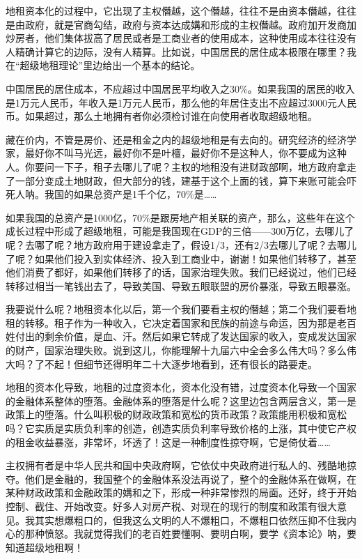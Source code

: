 \documentclass[UTF8, 12pt, a4paper]{ctexrep}
\begin{document}
地租资本化的过程中，它出现了主权僭越，这个僭越，往往不是由资本僭越，往往是由政府，就是官商勾结，政府与资本达成媾和形成的主权僭越。政府加开发商加炒房者，他们集体拔高了居民或者是工商业者的使用成本，这种使用成本往往没有人精确计算它的边际，没有人精算。比如说，中国居民的居住成本极限在哪里？我在“超级地租理论”里边给出一个基本的结论。

中国居民的居住成本，不应超过中国居民平均收入之30\%。如果我国的居民的收入是1万元人民币，年收入是1万元人民币，那么他的年居住支出不应超过3000元人民币。如果超过，那么土地拥有者你必须检讨谁在向使用者收取超级地租。

藏在价内，不管是房价、还是租金之内的超级地租是有去向的。研究经济的经济学家，最好你不叫马光远，最好你不是叶檀，最好你不是这种人，你不要成为这种人。你要问一下子，租子去哪儿了呢？主权的地租没有进财政部啊，地方政府拿走了一部分变成土地财政，但大部分的钱，建基于这个上面的钱，算下来账可能会吓死人呐。我国的如果总资产是1千个亿，70\%是……

如果我国的总资产是1000亿，70\%是跟房地产相关联的资产，那么，这些年在这个成长过程中形成了超级地租，可能是我国现在GDP的三倍——300万亿，去哪儿了呢？去哪了呢？地方政府用于建设拿走了，假设1/3，还有2/3去哪儿了呢？去哪儿了呢？如果他们投入到实体经济、投入到工商业中，谢谢！如果他们转移了，甚至他们消费了都好，如果他们转移了的话，国家治理失败。我们已经说过，他们已经转移过相当一笔钱出去了，导致美国、导致五眼联盟的房价暴涨，导致五眼暴涨。

我要说什么呢？地租资本化以后，第一个我们要看主权的僭越；第二个我们要看地租的转移。租子作为一种收入，它决定着国家和民族的前途与命运，因为那是老百姓付出的剩余价值，是血、汗。然后如果它转成了发达国家的收入，变成发达国家的财产，国家治理失败。说到这儿，你能理解十九届六中全会多么伟大吗？多么伟大吗？了不起！但细节还得明年二十大逐步地看到，还有很长的路要走。

地租的资本化导致，地租的过度资本化，资本化没有错，过度资本化导致一个国家的金融体系整体的堕落。金融体系的堕落是什么呢？这里边包含两层含义，第一是政策上的堕落。什么叫积极的财政政策和宽松的货币政策？政策能用积极和宽松吗？它实质是实质负利率的创造，创造实质负利率导致价格的上涨，其中使它产权的租金收益暴涨，非常坏，坏透了！这是一种制度性掠夺啊，它是倚仗着……

主权拥有者是中华人民共和国中央政府啊，它依仗中央政府进行私人的、残酷地掠夺。他们是金融的，我国整个的金融体系没法再说了，整个的金融体系在做啊，在某种财政政策和金融政策的媾和之下，形成一种非常惨烈的局面。还好，终于开始控制、截住、开始改变。好多人对房产税、对现在的现行的制度和政策有很大意见。我其实想爆粗口的，但我这么文明的人不爆粗口，不爆粗口依然压抑不住我内心的那种愤怒。我就觉得我们的老百姓要懂啊、要明白啊，要学《资本论》呐，要知道超级地租啊！
\end{document}
